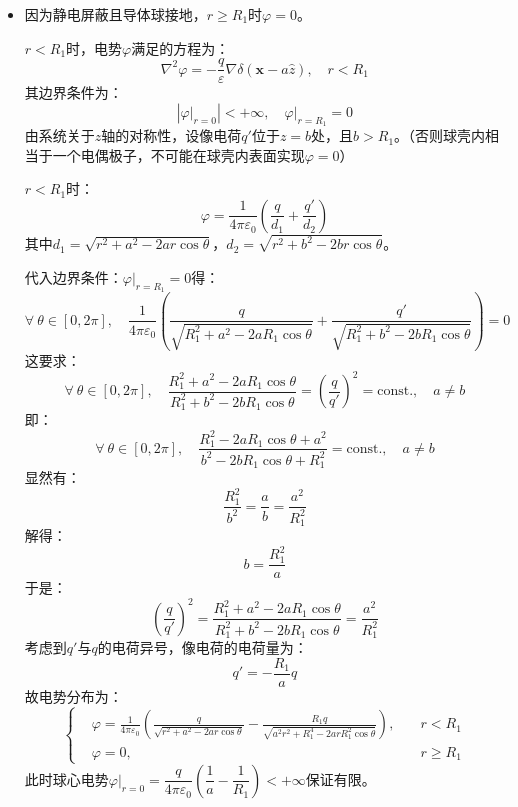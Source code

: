 \documentclass[a4paper,fontset=none]{ctexart}
\begin{document}
\begin{itemize}
        \item[9.]
        因为静电屏蔽且导体球接地，$r\geqslant R_1$时$\varphi=0$。

        $r<R_1$时，电势$\varphi$满足的方程为：
        \[
        \nabla^2\varphi = -\frac{q}{\varepsilon}\nabla\delta(\bm{x}-a\hat{z}),\quad r<R_1
        \]
        其边界条件为：
        \[
        \left|\left.\varphi\right|_{r=0}\right| < +\infty,\quad
        \left.\varphi\right|_{r=R_1} = 0
        \]
        由系统关于$z$轴的对称性，设像电荷$q'$位于$z=b$处，且$b>R_1$。（否则球壳内相当于一个电偶极子，不可能在球壳内表面实现$\varphi=0$）

        $r<R_1$时：
        \[
        \varphi = \frac{1}{4\pi\varepsilon_0}\left(\frac{q}{d_1} + \frac{q'}{d_2}\right)
        \]
        其中$d_1=\sqrt{r^2+a^2-2ar\cos\theta}$，$d_2=\sqrt{r^2+b^2-2br\cos\theta}$。

        代入边界条件：$\left.\varphi\right|_{r=R_1}=0$得：
        \[
        \forall\ \theta\in[0,2\pi],\quad \frac{1}{4\pi\varepsilon_0}\left(\frac{q}{\sqrt{R_1^2+a^2-2aR_1\cos\theta}} + \frac{q'}{\sqrt{R_1^2+b^2-2bR_1\cos\theta}}\right) = 0
        \]
        这要求：
        \[
        \forall\ \theta\in[0,2\pi],\quad \frac{R_1^2+a^2-2aR_1\cos\theta}{R_1^2+b^2-2bR_1\cos\theta} = \left(\frac{q}{q'}\right)^2 = \mathrm{const.},\quad a\neq b
        \]
        即：
        \[
        \forall\ \theta\in[0,2\pi],\quad \frac{R_1^2-2aR_1\cos\theta+a^2}{b^2-2bR_1\cos\theta+R_1^2} = \mathrm{const.},\quad a\neq b
        \]
        显然有：
        \[
        \frac{R_1^2}{b^2} = \frac{a}{b} = \frac{a^2}{R_1^2}
        \]
        解得：
        \[
        b = \frac{R_1^2}{a}
        \]
        于是：
        \[
        \left(\frac{q}{q'}\right)^2 = \frac{R_1^2+a^2-2aR_1\cos\theta}{R_1^2+b^2-2bR_1\cos\theta} = \frac{a^2}{R_1^2}
        \]
        考虑到$q'$与$q$的电荷异号，像电荷的电荷量为：
        \[
        q' = -\frac{R_1}{a}q
        \]
        故电势分布为：
        \[
        \left\{
            \begin{aligned}
                &\varphi = \frac{1}{4\pi\varepsilon_0}\left(\frac{q}{\sqrt{r^2+a^2-2ar\cos\theta}} - \frac{R_1q}{\sqrt{a^2r^2+R_1^4-2arR_1^2\cos\theta}}\right),\quad &r<R_1 \\
                &\varphi = 0,\quad &r\geqslant R_1
            \end{aligned}
        \right.
        \]
        此时球心电势$\left.\varphi\right|_{r=0}=\dfrac{q}{4\pi\varepsilon_0}\left(\dfrac{1}{a}-\dfrac{1}{R_1}\right)<+\infty$保证有限。


\end{itemize}
\end{document}
